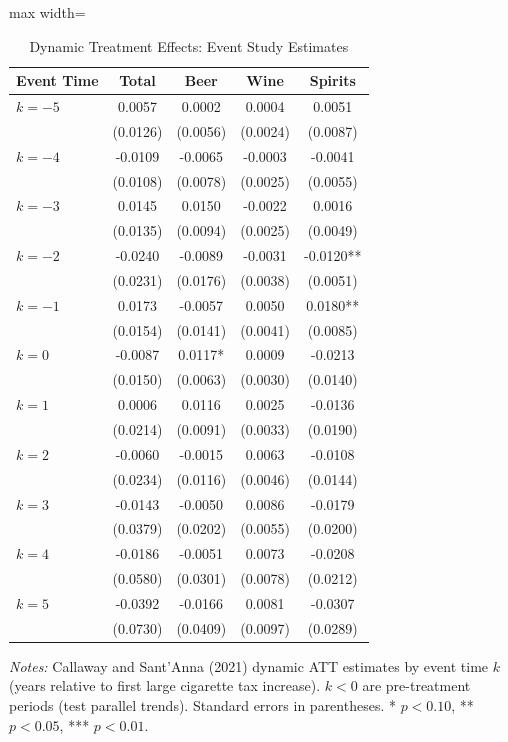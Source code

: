 \begin{table}[H]
\centering
\caption{Dynamic Treatment Effects: Event Study Estimates}
\label{tab:eventstudy}
\begin{threeparttable}
\begin{adjustbox}{max width=\textwidth}
\begin{tabular}{lcccc}
\toprule
Event Time & Total & Beer & Wine & Spirits \\
\midrule
$k = -5$ & 0.0057 & 0.0002 & 0.0004 & 0.0051 \\
 & (0.0126) & (0.0056) & (0.0024) & (0.0087) \\
$k = -4$ & -0.0109 & -0.0065 & -0.0003 & -0.0041 \\
 & (0.0108) & (0.0078) & (0.0025) & (0.0055) \\
$k = -3$ & 0.0145 & 0.0150 & -0.0022 & 0.0016 \\
 & (0.0135) & (0.0094) & (0.0025) & (0.0049) \\
$k = -2$ & -0.0240 & -0.0089 & -0.0031 & -0.0120** \\
 & (0.0231) & (0.0176) & (0.0038) & (0.0051) \\
$k = -1$ & 0.0173 & -0.0057 & 0.0050 & 0.0180** \\
 & (0.0154) & (0.0141) & (0.0041) & (0.0085) \\
$k = 0$ & -0.0087 & 0.0117* & 0.0009 & -0.0213 \\
 & (0.0150) & (0.0063) & (0.0030) & (0.0140) \\
$k = 1$ & 0.0006 & 0.0116 & 0.0025 & -0.0136 \\
 & (0.0214) & (0.0091) & (0.0033) & (0.0190) \\
$k = 2$ & -0.0060 & -0.0015 & 0.0063 & -0.0108 \\
 & (0.0234) & (0.0116) & (0.0046) & (0.0144) \\
$k = 3$ & -0.0143 & -0.0050 & 0.0086 & -0.0179 \\
 & (0.0379) & (0.0202) & (0.0055) & (0.0200) \\
$k = 4$ & -0.0186 & -0.0051 & 0.0073 & -0.0208 \\
 & (0.0580) & (0.0301) & (0.0078) & (0.0212) \\
$k = 5$ & -0.0392 & -0.0166 & 0.0081 & -0.0307 \\
 & (0.0730) & (0.0409) & (0.0097) & (0.0289) \\
\bottomrule
\end{tabular}
\end{adjustbox}
\begin{tablenotes}[flushleft]
\small
\item \textit{Notes:} Callaway and Sant'Anna (2021) dynamic ATT estimates by event time $k$ (years relative to first large cigarette tax increase). $k < 0$ are pre-treatment periods (test parallel trends). Standard errors in parentheses.
 * $p<0.10$, ** $p<0.05$, *** $p<0.01$.
\end{tablenotes}
\end{threeparttable}
\end{table}

